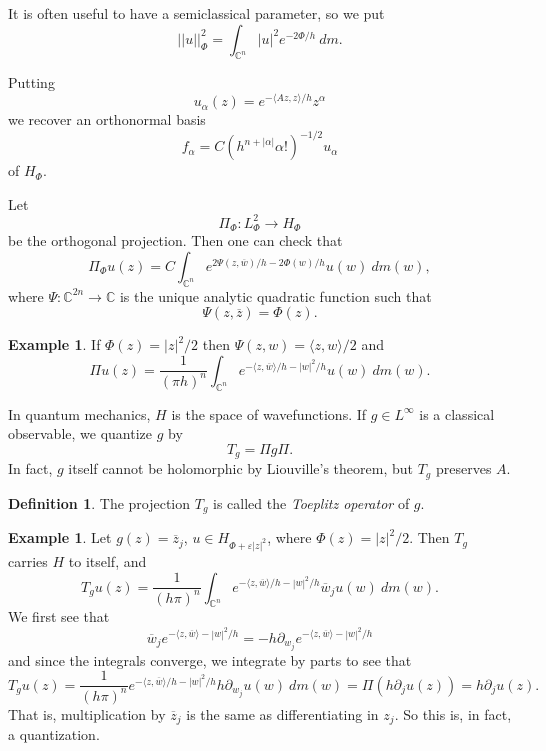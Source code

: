 \documentclass[12pt]{report}
\newcommand{\CC}{\mathbb{C}}
\newcommand{\dfn}[1]{\emph{#1}\index{#1}}
\theoremstyle{definition}
\newtheorem{definition}[theorem]{Definition}
\newtheorem{example}[theorem]{Example}
\begin{document}
It is often useful to have a semiclassical parameter, so we put
$$||u||_\Phi^2 = \int_{\CC^n} |u|^2 e^{-2\Phi/h} ~dm.$$

Putting
$$u_\alpha(z) = e^{-\langle Az, z\rangle/h} z^\alpha$$
we recover an orthonormal basis
$$f_\alpha = C (h^{n + |\alpha|} \alpha!)^{-1/2}u_\alpha$$
of $H_\Phi$.

Let
$$\Pi_\Phi: L^2_\Phi \to H_\Phi$$
be the orthogonal projection. Then one can check that
$$\Pi_\Phi u(z) = C \int_{\CC^n} e^{2\Psi(z, \overline w)/h - 2\Phi(w)/h} u(w) ~dm(w),$$
where $\Psi: \CC^{2n} \to \CC$ is the unique analytic quadratic function such that
$$\Psi(z, \overline z) = \Phi(z).$$
\begin{example}
    If $\Phi(z) = |z|^2/2$ then $\Psi(z, w) = \langle z, w\rangle/2$ and
$$\Pi u(z) = \frac{1}{(\pi h)^n} \int_{\CC^n} e^{-\langle z, \overline w\rangle/h - |w|^2/h}u(w) ~dm(w).$$
\end{example}
    In quantum mechanics, $H$ is the space of wavefunctions. If $g \in L^\infty$ is a classical observable, we quantize $g$ by
    $$T_g = \Pi g \Pi.$$
    In fact, $g$ itself cannot be holomorphic by Liouville's theorem, but $T_g$ preserves $A$.
\begin{definition}
    The projection $T_g$ is called the \dfn{Toeplitz operator} of $g$.
\end{definition}
\begin{example}
    Let $g(z) = \overline z_j$, $u \in H_{\Phi + \varepsilon|z|^2}$, where $\Phi(z) = |z|^2/2$. Then $T_g$ carries $H$ to itself, and
    $$T_gu(z) = \frac{1}{(h\pi)^n} \int_{\CC^n} e^{-\langle z, \overline w \rangle/h - |w|^2/h} \overline w_j u(w) ~dm(w).$$
    We first see that
    $$\overline w_j e^{-\langle z, \overline w\rangle - |w|^2/h} = -h\partial_{w_j} e^{-\langle z, \overline w\rangle - |w|^2/h}$$
    and since the integrals converge, we integrate by parts to see that
    $$T_gu(z) = \frac{1}{(h\pi)^n} e^{-\langle z, \overline w\rangle/h - |w|^2/h} h\partial_{w_j}u(w) ~dm(w) = \Pi(h\partial_ju(z)) = h\partial_j u(z).$$
    That is, multiplication by $\overline z_j$ is the same as differentiating in $z_j$. So this is, in fact, a quantization.
\end{example}
\end{document}
